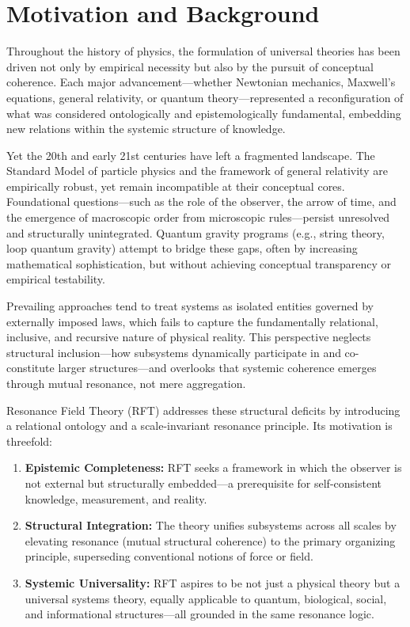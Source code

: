 \documentclass[12pt]{iopart}
\begin{document}
\section{Motivation and Background}

Throughout the history of physics, the formulation of universal theories has been driven not only by empirical necessity but also by the pursuit of conceptual coherence. Each major advancement—whether Newtonian mechanics, Maxwell's equations, general relativity, or quantum theory—represented a reconfiguration of what was considered ontologically and epistemologically fundamental, embedding new relations within the systemic structure of knowledge.

Yet the 20th and early 21st centuries have left a fragmented landscape. The Standard Model of particle physics and the framework of general relativity are empirically robust, yet remain incompatible at their conceptual cores. Foundational questions—such as the role of the observer, the arrow of time, and the emergence of macroscopic order from microscopic rules—persist unresolved and structurally unintegrated. Quantum gravity programs (e.g., string theory, loop quantum gravity) attempt to bridge these gaps, often by increasing mathematical sophistication, but without achieving conceptual transparency or empirical testability.

Prevailing approaches tend to treat systems as isolated entities governed by externally imposed laws, which fails to capture the fundamentally relational, inclusive, and recursive nature of physical reality. This perspective neglects structural inclusion—how subsystems dynamically participate in and co-constitute larger structures—and overlooks that systemic coherence emerges through mutual resonance, not mere aggregation.

Resonance Field Theory (RFT) addresses these structural deficits by introducing a relational ontology and a scale-invariant resonance principle. Its motivation is threefold:

\begin{enumerate}
	\item \textbf{Epistemic Completeness:} RFT seeks a framework in which the observer is not external but structurally embedded—a prerequisite for self-consistent knowledge, measurement, and reality.
	\item \textbf{Structural Integration:} The theory unifies subsystems across all scales by elevating resonance (mutual structural coherence) to the primary organizing principle, superseding conventional notions of force or field.
	\item \textbf{Systemic Universality:} RFT aspires to be not just a physical theory but a universal systems theory, equally applicable to quantum, biological, social, and informational structures—all grounded in the same resonance logic.
\end{enumerate}
\end{document}
